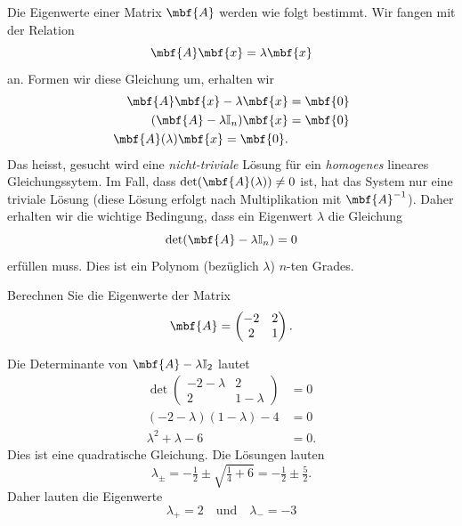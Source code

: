 Die Eigenwerte einer Matrix $\mbf{A}$ werden wie folgt bestimmt. Wir fangen mit der Relation 
\begin{equation}
  \mbf{A}\mbf{x} = \lambda \mbf{x}
\end{equation}
an. Formen wir diese Gleichung um, erhalten wir
\begin{equation}
  \begin{split}
    \mbf{A}\mbf{x} - \lambda \mbf{x} &= \mbf{0}\\
    (\mbf{A} - \lambda \mathbb{I}_n) \mbf{x} &= \mbf{0} \\
    \mbf{A}(\lambda) \mbf{x} = \mbf{0}.
  \end{split}
\end{equation}
Das heisst, gesucht wird eine \emph{nicht-triviale} Lösung für ein \emph{homogenes} lineares Gleichungssytem. Im Fall, dass $\det(\mbf{A}(\lambda)) \not= 0$ ist, hat das System nur eine triviale Lösung (diese Lösung erfolgt nach Multiplikation mit $\mbf{A}^{-1}$). Daher erhalten wir die wichtige Bedingung, dass ein Eigenwert $\lambda$ die Gleichung
\begin{equation}
  \det(\mbf{A} - \lambda \mathbb{I}_n) = 0
\end{equation}
erfüllen muss. Dies ist ein Polynom (bezüglich $\lambda$) $n$-ten Grades.

\begin{beispiel}\label{ex:22eigs}
  Berechnen Sie die Eigenwerte der Matrix
  \begin{equation}
    \mbf{A} = \begin{pmatrix}
      -2 & 2 \\ 2 & 1
    \end{pmatrix}.
  \end{equation}
\end{beispiel}
\begin{lösung}
  Die Determinante von $\mbf{A} - \lambda \mathbb{I}_2$ lautet
  \begin{equation}
    \begin{split}
      \det\begin{pmatrix}
      -2 -\lambda & 2 \\ 2 & 1 -\lambda
    \end{pmatrix} &= 0\\
      (-2-\lambda)(1-\lambda)-4 &=0 \\
      \lambda^2+\lambda - 6 &= 0. 
    \end{split}
  \end{equation}
  Dies ist eine quadratische Gleichung. Die Lösungen lauten
  \begin{equation}
    \lambda_{\pm} = -\tfrac12 \pm \sqrt{\tfrac14+6} = -\tfrac12 \pm \tfrac{5}{2}.
  \end{equation}
  Daher lauten die Eigenwerte
  \begin{equation}
    \lambda_+ = 2 \quad \text{und} \quad \lambda_- = -3
  \end{equation}
\end{lösung}


